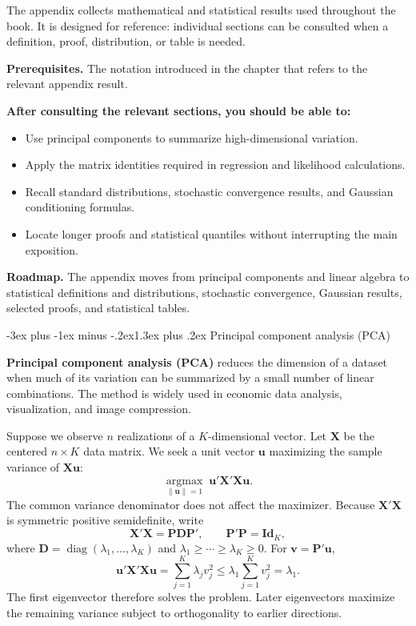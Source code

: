 \documentclass[
  11pt,
]{book}
\makeatletter
\providecommand{\tightlist}{%
  \setlength{\itemsep}{0pt}\setlength{\parskip}{0pt}}
\renewcommand\section{\@startsection{section}{1}{\z@}
  {-3ex plus -1ex minus -.2ex}{1.3ex plus .2ex}
  {\normalfont\Large\bfseries\color{TextbookInk}}}
\theoremstyle{definition}
\theoremstyle{definition}
\theoremstyle{definition}
\theoremstyle{definition}
\theoremstyle{remark}
\makeatother
\begin{document}
The appendix collects mathematical and statistical results used throughout the book. It is designed for reference: individual sections can be consulted when a definition, proof, distribution, or table is needed.

\textbf{Prerequisites.} The notation introduced in the chapter that refers to the relevant appendix result.

\textbf{After consulting the relevant sections, you should be able to:}

\begin{itemize}
\tightlist
\item
  Use principal components to summarize high-dimensional variation.
\item
  Apply the matrix identities required in regression and likelihood calculations.
\item
  Recall standard distributions, stochastic convergence results, and Gaussian conditioning formulas.
\item
  Locate longer proofs and statistical quantiles without interrupting the main exposition.
\end{itemize}

\textbf{Roadmap.} The appendix moves from principal components and linear algebra to statistical definitions and distributions, stochastic convergence, Gaussian results, selected proofs, and statistical tables.

\section{Principal component analysis (PCA)}\label{PCAapp}

\textbf{Principal component analysis (PCA)} reduces the dimension of a dataset when much of its variation can be summarized by a small number of linear combinations. The method is widely used in economic data analysis, visualization, and image compression.

Suppose we observe \(n\) realizations of a \(K\)-dimensional vector. Let \(\mathbf{X}\) be the centered \(n\times K\) data matrix. We seek a unit vector \(\mathbf{u}\) maximizing the sample variance of \(\mathbf{X}\mathbf{u}\):
\begin{equation}
\underset{\|\mathbf{u}\|=1}{\operatorname{argmax}}\;
\mathbf{u}'\mathbf{X}'\mathbf{X}\mathbf{u}. \label{eq:PCA11}
\end{equation}
The common variance denominator does not affect the maximizer. Because \(\mathbf{X}'\mathbf{X}\) is symmetric positive semidefinite, write
\[
\mathbf{X}'\mathbf{X}=\mathbf{P}\mathbf{D}\mathbf{P}',\qquad
\mathbf{P}'\mathbf{P}=\mathbf{Id}_K,
\]
where \(\mathbf{D}=\operatorname{diag}(\lambda_1,\ldots,\lambda_K)\) and \(\lambda_1\geq\cdots\geq\lambda_K\geq0\). For \(\mathbf{v}=\mathbf{P}'\mathbf{u}\),
\[
\mathbf{u}'\mathbf{X}'\mathbf{X}\mathbf{u}
=\sum_{j=1}^K\lambda_j v_j^2\leq\lambda_1\sum_{j=1}^Kv_j^2=\lambda_1.
\]
The first eigenvector therefore solves the problem. Later eigenvectors maximize the remaining variance subject to orthogonality to earlier directions.
\end{document}
